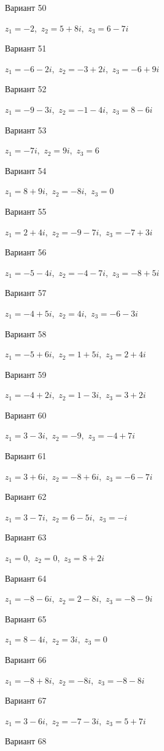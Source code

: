 \documentclass[11pt]{report}
\begin{document}
Вариант 50

$z_1 = -2$,\ $z_2 = 5 + 8 i$,\ $z_3 = 6 - 7 i$

Вариант 51

$z_1 = -6 - 2 i$,\ $z_2 = -3 + 2 i$,\ $z_3 = -6 + 9 i$

Вариант 52

$z_1 = -9 - 3 i$,\ $z_2 = -1 - 4 i$,\ $z_3 = 8 - 6 i$

Вариант 53

$z_1 = - 7 i$,\ $z_2 = 9 i$,\ $z_3 = 6$

Вариант 54

$z_1 = 8 + 9 i$,\ $z_2 = - 8 i$,\ $z_3 = 0$

Вариант 55

$z_1 = 2 + 4 i$,\ $z_2 = -9 - 7 i$,\ $z_3 = -7 + 3 i$

Вариант 56

$z_1 = -5 - 4 i$,\ $z_2 = -4 - 7 i$,\ $z_3 = -8 + 5 i$

Вариант 57

$z_1 = -4 + 5 i$,\ $z_2 = 4 i$,\ $z_3 = -6 - 3 i$

Вариант 58

$z_1 = -5 + 6 i$,\ $z_2 = 1 + 5 i$,\ $z_3 = 2 + 4 i$

Вариант 59

$z_1 = -4 + 2 i$,\ $z_2 = 1 - 3 i$,\ $z_3 = 3 + 2 i$

Вариант 60

$z_1 = 3 - 3 i$,\ $z_2 = -9$,\ $z_3 = -4 + 7 i$

Вариант 61

$z_1 = 3 + 6 i$,\ $z_2 = -8 + 6 i$,\ $z_3 = -6 - 7 i$

Вариант 62

$z_1 = 3 - 7 i$,\ $z_2 = 6 - 5 i$,\ $z_3 = - i$

Вариант 63

$z_1 = 0$,\ $z_2 = 0$,\ $z_3 = 8 + 2 i$

Вариант 64

$z_1 = -8 - 6 i$,\ $z_2 = 2 - 8 i$,\ $z_3 = -8 - 9 i$

Вариант 65

$z_1 = 8 - 4 i$,\ $z_2 = 3 i$,\ $z_3 = 0$

Вариант 66

$z_1 = -8 + 8 i$,\ $z_2 = - 8 i$,\ $z_3 = -8 - 8 i$

Вариант 67

$z_1 = 3 - 6 i$,\ $z_2 = -7 - 3 i$,\ $z_3 = 5 + 7 i$

Вариант 68
\end{document}
